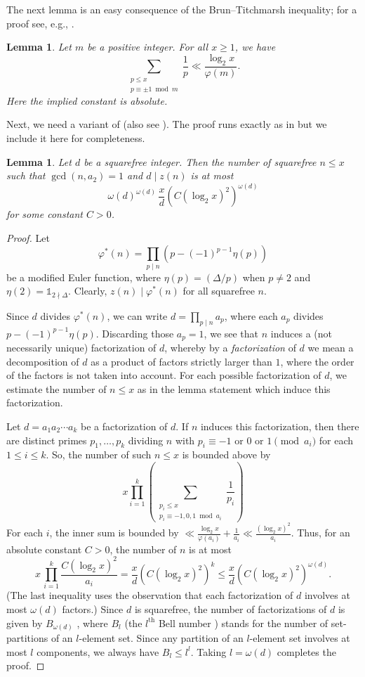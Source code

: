 \documentclass[12pt,a4paper,oneside]{amsart}
\newtheorem{lemma}[theorem]{Lemma}
\begin{document}
The next lemma is an easy consequence of the Brun–Titchmarsh inequality; for a proof
see, e.g., \cite[Lemma 6]{KAct}.

\begin{lemma}
    Let $m$ be a positive integer. For all $x\ge 1$, we have \[\sum_{\substack{ p\le x \\ p\equiv \pm 1\bmod{m}}}\frac1{p}\ll \frac{\log_2 x}{\varphi(m)}.\] Here the implied constant is absolute.
\end{lemma}
Next, we need a variant of \cite[Lemma 7]{Po192} (also see \cite[Lemma 2.4]{Po11}). The proof runs exactly as in \cite{Po11} but we include it here for completeness.

\begin{lemma}\label{lemma 2.4}
    Let $d$ be a squarefree integer. Then the number of squarefree $n\le x$ such that $\gcd(n,a_2)=1$ and $d\mid z(n)$ is at most \[\omega(d)^{\omega(d)} \,\frac{x}{d} (C (\log_{2}x)^2)^{\omega(d)}\] for some constant $C>0$.
\end{lemma}
\begin{proof}
    Let \[\varphi^{*}(n)=\prod_{p\mid n} \left(p - (-1)^{p-1}\eta(p)\right)\] be a modified Euler function, where $\eta(p)=(\Delta/p)$ when $p\neq 2$ and $\eta(2)= \mathds{1}_{2\nmid \Delta}$. Clearly, $z(n) \mid \varphi^{*}(n)$ for all squarefree $n$. 
    
Since $d$ divides $\varphi^{*}(n)$, we can write $d = \prod_{p \mid n} a_p$, where each $a_p$ divides $p - (-1)^{p-1}\eta(p)$. Discarding those $a_p = 1$, we see that $n$ induces a (not necessarily unique) factorization of $d$, whereby by a \emph{factorization} of $d$ we mean a decomposition of $d$ as a product of factors strictly larger than $1$, where the order of the factors is not taken into account. For each possible factorization of $d$, we estimate the number of $n \leq x$ as in the lemma statement which induce this factorization.

Let $d = a_1 a_2 \cdots a_k$ be a factorization of $d$. If $n$ induces this factorization, then there are distinct primes $p_1, \ldots, p_k$ dividing $n$ with $p_i \equiv -1\text{ or }0\text{ or }1 \pmod{a_i}$ for each $1 \leq i \leq k$. So, the number of such $n \leq x$ is bounded above by 
\[x\prod_{i=1}^{k}\left(\sum_{\substack{p_i\le x\\ p_i\equiv -1,0,1\bmod{a_i}}}\frac1{p_i}\right)\]
For each $i$, the inner sum is bounded by $\ll \frac{\log_{2} x}{\varphi(a_i)}+\frac1{a_i}\ll \frac{(\log_{2} x)^{2}}{a_i}$. Thus, for an absolute constant $C>0$, the number of $n$ is at most 
$$
x \, \prod_{i=1}^k \frac{C (\log_2 x)^{2}}{a_i} 
= \frac{x}{d} (C (\log_2 x)^{2})^k 
\leq \frac{x}{d} (C (\log_2 x)^{2})^{\omega(d)}.$$ (The last inequality uses the observation that each factorization of $d$ involves at most $\omega(d)$
factors.) Since $d$ is squarefree, the number of factorizations of $d$ is given by $B_{\omega(d)}$
, where $B_l$
(the $l^{\text{th}}$ Bell number ) stands for the number of set-partitions of an $l$-element set.
Since any partition of an $l$-element set involves at most $l$ components, we always
have $B_l\le  l^{l}$. Taking $l = \omega(d)$ completes the proof.
\end{proof}
\end{document}
